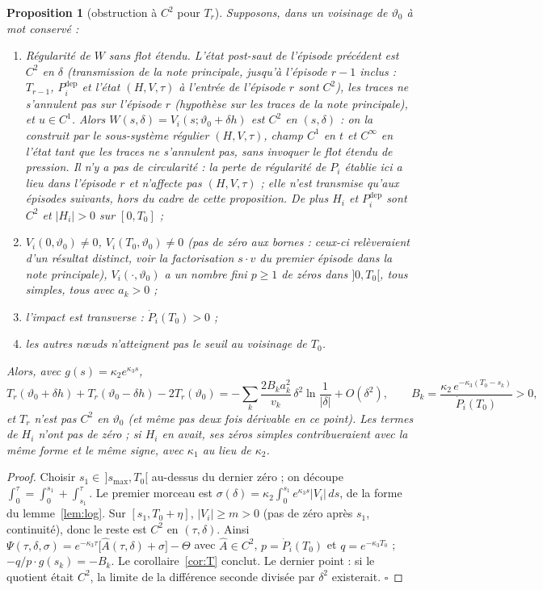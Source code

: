 \documentclass[11pt,a4paper]{article}
\newtheorem{proposition}[theoreme]{Proposition}
\theoremstyle{remark}
\newcommand{\vth}{\vartheta}
\newcommand{\dl}{\delta}
\begin{document}
\begin{proposition}[obstruction à $C^2$ pour $T_r$]\label{prop:app}
Supposons, dans un voisinage de $\vth_0$ à mot conservé :
\begin{enumerate}[nosep,label=(\alph*)]
\item \emph{Régularité de $W$ sans flot étendu.} L'état post-saut de l'épisode précédent est $C^2$ en $\dl$ (transmission de la note principale, jusqu'à l'épisode $r-1$ inclus : $T_{r-1}$, $P_i^{\mathrm{dep}}$ et l'état $(H,V,\tau)$ à l'entrée de l'épisode $r$ sont $C^2$), les traces ne s'annulent pas sur l'épisode $r$ (hypothèse sur les traces de la note principale), et $u\in C^1$. Alors $W(s,\dl)=V_i(s;\vth_0+\dl h)$ est $C^2$ en $(s,\dl)$ : on la construit par le \emph{sous-système régulier} $(H,V,\tau)$, champ $C^1$ en $t$ et $C^\infty$ en l'état tant que les traces ne s'annulent pas, sans invoquer le flot étendu de pression. Il n'y a pas de circularité : la perte de régularité de $P_i$ établie ici a lieu \emph{dans} l'épisode $r$ et n'affecte pas $(H,V,\tau)$ ; elle n'est transmise qu'aux épisodes suivants, hors du cadre de cette proposition. De plus $H_i$ et $P_i^{\mathrm{dep}}$ sont $C^2$ et $\lvert H_i\rvert>0$ sur $[0,T_0]$ ;
\item $V_i(0,\vth_0)\neq0$, $V_i(T_0,\vth_0)\neq0$ (pas de zéro aux bornes : ceux-ci relèveraient d'un résultat distinct, voir la factorisation $s\cdot v$ du premier épisode dans la note principale), $V_i(\cdot,\vth_0)$ a un nombre fini $p\ge1$ de zéros dans $]0,T_0[$, tous simples, tous avec $a_k>0$ ;
\item l'impact est transverse : $\dot P_i(T_0)>0$ ;
\item les autres n\oe uds n'atteignent pas le seuil au voisinage de $T_0$.
\end{enumerate}
Alors, avec $g(s)=\kappa_2e^{\kappa_3s}$,
\[
T_r(\vth_0+\dl h)+T_r(\vth_0-\dl h)-2T_r(\vth_0)=-\sum_k\frac{2B_ka_k^2}{v_k}\,\dl^2\ln\frac1{\lvert\dl\rvert}+O(\dl^2),\qquad B_k=\frac{\kappa_2\,e^{-\kappa_3(T_0-s_k)}}{\dot P_i(T_0)}>0 ,
\]
et $T_r$ n'est pas $C^2$ en $\vth_0$ (et même pas deux fois dérivable en ce point). Les termes de $H_i$ n'ont pas de zéro ; si $H_i$ en avait, ses zéros simples contribueraient avec la même forme et le même signe, avec $\kappa_1$ au lieu de $\kappa_2$.
\end{proposition}
\begin{proof}
Choisir $s_1\in\,]s_{\max},T_0[$ au-dessus du dernier zéro ; on découpe $\int_0^\tau=\int_0^{s_1}+\int_{s_1}^\tau$. Le premier morceau est $\sigma(\dl)=\kappa_2\int_0^{s_1}e^{\kappa_3s}\lvert V_i\rvert\,ds$, de la forme du lemme~\ref{lem:log}. Sur $[s_1,T_0+\eta]$, $\lvert V_i\rvert\ge m>0$ (pas de zéro après $s_1$, continuité), donc le reste est $C^2$ en $(\tau,\dl)$. Ainsi $\Psi(\tau,\dl,\sigma)=e^{-\kappa_3\tau}\bigl[\widehat A(\tau,\dl)+\sigma\bigr]-\Theta$ avec $\widehat A\in C^2$, $p=\dot P_i(T_0)$ et $q=e^{-\kappa_3T_0}$ ; $-q/p\cdot g(s_k)=-B_k$. Le corollaire~\ref{cor:T} conclut. Le dernier point : si le quotient était $C^2$, la limite de la différence seconde divisée par $\dl^2$ existerait. $\square$
\end{proof}
\end{document}
